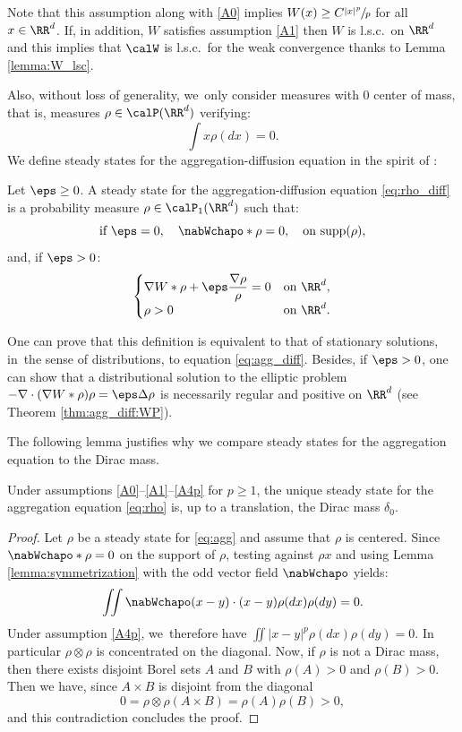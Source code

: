 Note that this assumption along with \eqref{A0} implies $W(x) \geq C \sfrac{|x|^p}{p}$ for all $x \in \RR^d$. If, in addition, $W$ satisfies assumption \eqref{A1} then $W$ is l.s.c.\ on $\RR^d$ and this implies that $\calW$ is l.s.c.\ for the weak convergence thanks to Lemma \ref{lemma:W_lsc}.

Also, without loss of generality, we~only consider measures with 0 center of mass, that is, measures $\rho \in \calP(\RR^d)$ verifying:
\[
\int x\rho (dx) = 0.
\]
We define steady states for the aggregation-diffusion equation in the spirit of \cite{kang19}:
\begin{defi}
Let $\eps \geq 0$. A steady state for the aggregation-diffusion equation \eqref{eq:rho_diff} is a probability measure $\rho \in \calP_1(\RR^d)$ such that:
\[
\text{if } \eps = 0, \quad \nabWchapo * \rho = 0, \quad \text{on } \mathrm{supp}(\rho),
\]
and, if $\eps > 0$:
\[
\begin{cases}
\nabla W * \rho + \eps \dfrac{\nabla \rho}{\rho} = 0 &\text{on } \RR^d,\\
\rho > 0&\text{on } \RR^d.
\end{cases}
\]
\end{defi}
One can prove that this definition is equivalent to that of stationary solutions, in~the sense of distributions, to equation \eqref{eq:agg_diff}. Besides, if $\eps > 0$, one can show that a distributional solution to the elliptic problem $- \nabla \cdot (\nabla W * \rho) \rho = \eps \Delta \rho$ is necessarily regular and positive on $\RR^d$ (see Theorem \ref{thm:agg_diff:WP}).

The following lemma justifies why we compare steady states for the aggregation equation to the Dirac mass.
\begin{lemma}
Under assumptions \eqref{A0}--\eqref{A1}--\eqref{A4p} for $p \geq 1$, the unique steady state for the aggregation equation \eqref{eq:rho} is, up to a translation, the Dirac mass $\delta_0$.
\end{lemma}

\begin{proof}
Let $\rho$ be a steady state for \eqref{eq:agg} and assume that $\rho$ is centered. Since $\nabWchapo * \rho = 0$ on the support of $\rho$, testing against $\rho x$ and using Lemma \ref{lemma:symmetrization} with the odd vector field $\nabWchapo$ yields:
\[
\iint \nabWchapo(x-y) \cdot (x-y) \rho(dx) \rho(dy) = 0.
\]
Under assumption \eqref{A4p}, we~therefore have $\iint |x-y|^p \rho(dx) \rho(dy) = 0$. In particular $\rho\otimes\rho$ is concentrated on the diagonal. Now, if $\rho$ is not a Dirac mass, then there exists disjoint Borel sets $A$ and $B$ with $\rho(A)>0$ and $\rho(B)>0$. Then we have, since $A\times B$ is disjoint from the diagonal
\[
0 =\rho \otimes \rho(A \times B) =\rho(A)\rho(B)> 0,
\]
and this contradiction concludes the proof.
\end{proof}

